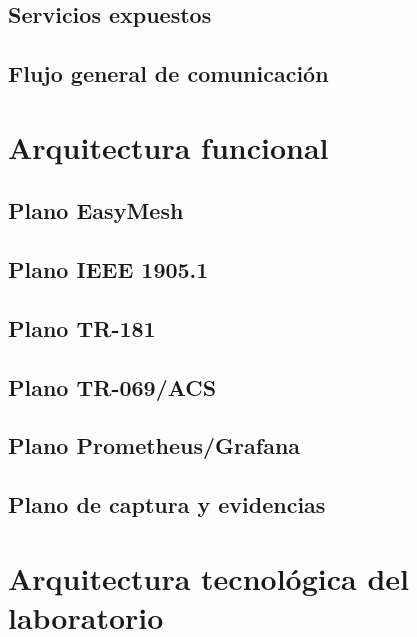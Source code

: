 \subsection{Servicios expuestos}
\label{subsec:servicios-expuestos}

\subsection{Flujo general de comunicación}
\label{subsec:flujo-general-comunicacion}


\section{Arquitectura funcional}
\label{sec:arquitectura-funcional}

\subsection{Plano EasyMesh}
\label{subsec:plano-easymesh}

\subsection{Plano IEEE 1905.1}
\label{subsec:plano-ieee-1905-1}

\subsection{Plano TR-181}
\label{subsec:plano-tr-181}

\subsection{Plano TR-069/ACS}
\label{subsec:plano-tr-069-acs}

\subsection{Plano Prometheus/Grafana}
\label{subsec:plano-prometheus-grafana}

\subsection{Plano de captura y evidencias}
\label{subsec:plano-captura-evidencias}


\section{Arquitectura tecnológica del laboratorio}
\label{sec:arquitectura-tecnologica-laboratorio}

